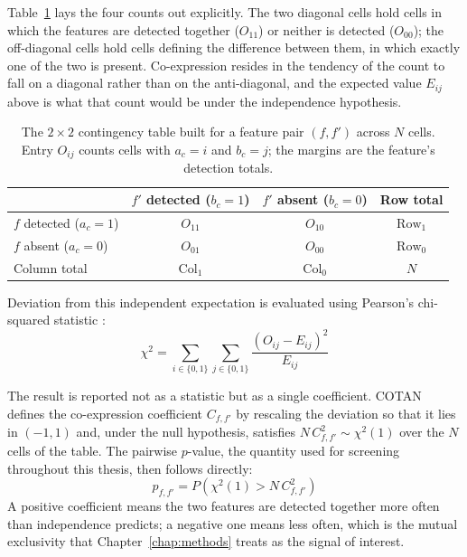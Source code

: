 Table~\ref{tab:contingency} lays the four counts out explicitly. The two diagonal cells hold cells in which the features are detected together ($O_{11}$) or neither is detected ($O_{00}$); the off-diagonal cells hold cells defining the difference between them, in which exactly one of the two is present. Co-expression resides in the tendency of the count to fall on a diagonal rather than on the anti-diagonal, and the expected value $E_{ij}$ above is what that count would be under the independence hypothesis.

\begin{table}[htbp]
\centering
\small
\setlength{\tabcolsep}{7pt}
\caption{The $2 \times 2$ contingency table built for a feature pair $(f, f')$ across $N$ cells. Entry $O_{ij}$ counts cells with $a_c = i$ and $b_c = j$; the margins are the feature's detection totals.}\label{tab:contingency}
\begin{tabular}{lccc}
\toprule
 & \textbf{$f'$ detected ($b_c = 1$)} & \textbf{$f'$ absent ($b_c = 0$)} & \textbf{Row total} \\
\midrule
$f$ detected ($a_c = 1$) & $O_{11}$ & $O_{10}$ & $\mathrm{Row}_1$ \\
$f$ absent ($a_c = 0$) & $O_{01}$ & $O_{00}$ & $\mathrm{Row}_0$ \\
\midrule
Column total & $\mathrm{Col}_1$ & $\mathrm{Col}_0$ & $N$ \\
\bottomrule
\end{tabular}
\end{table}
Deviation from this independent expectation is evaluated using Pearson's chi-squared statistic \cite{galfre2021cotan}:
$$ \chi^2 = \sum_{i \in \{0,1\}} \sum_{j \in \{0,1\}} \frac{(O_{ij} - E_{ij})^2}{E_{ij}} $$

The result is reported not as a statistic but as a single coefficient. COTAN defines the co-expression coefficient $C_{f,f'}$ by rescaling the deviation so that it lies in $(-1, 1)$ and, under the null hypothesis, satisfies $N\,C_{f,f'}^2 \sim \chi^2(1)$ over the $N$ cells of the table. The pairwise $p$-value, the quantity used for screening throughout this thesis, then follows directly:
$$ p_{f,f'} = P\!\left(\chi^2(1) > N\,C_{f,f'}^2\right) $$
A positive coefficient means the two features are detected together more often than independence predicts; a negative one means less often, which is the mutual exclusivity that Chapter~\ref{chap:methods} treats as the signal of interest.

